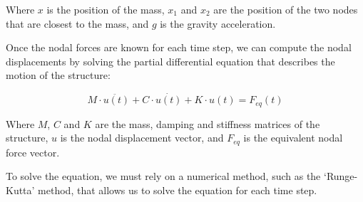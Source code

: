 Where $x$ is the position of the mass, $x_1$ and $x_2$ are the position of the two nodes that are closest to the mass, and $g$ is the gravity acceleration.

Once the nodal forces are known for each time step, we can compute the nodal displacements by solving the partial differential equation that describes the motion of the structure:

\begin{equation}
    M \cdot \ddot{u(t)} + C \cdot \dot{u(t)} + K \cdot u(t) = F_{eq}(t)
    \label{eq:dynamic_equation}
\end{equation}

Where $M$, $C$ and $K$ are the mass, damping and stiffness matrices of the structure, $u$ is the nodal displacement vector, and $F_{eq}$ is the equivalent nodal force vector.

To solve the equation, we must rely on a numerical method, such as the `Runge-Kutta' method, that allows us to solve the equation for each time step.
